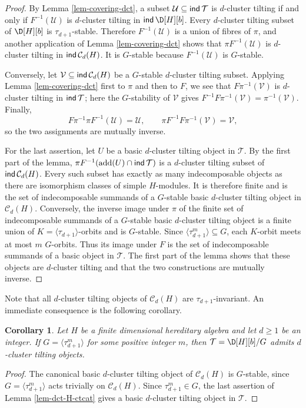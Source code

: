 \documentclass[12pt]{article}
\theoremstyle{plain}
\newtheorem{Coro}[Def]{Corollary}
\theoremstyle{definition}
\DeclareMathOperator{\add}{add}
\DeclareMathOperator{\ind}{\sf ind}
\newcommand{\Db}[1][]{\D[#1][b]}
\newcommand{\T}{\mathcal{T}}
\renewcommand{\geq}{\geqslant}
\begin{document}
\begin{proof}
By Lemma \ref{lem-covering-dct}, a subset
\(\mathcal U\subseteq\ind\mathcal T\) is $d$-cluster tilting if and only if
\(F^{-1}(\mathcal U)\) is $d$-cluster tilting in \(\ind\Db[H]\).  Every
$d$-cluster tilting subset of \(\Db[H]\) is
\(\tau_{d+1}\)-stable.  Therefore
\(F^{-1}(\mathcal U)\) is a union of fibres of \(\pi\), and another
application of Lemma \ref{lem-covering-dct} shows that
\(\pi F^{-1}(\mathcal U)\) is $d$-cluster tilting in
\(\ind\mathcal C_d(H)\).  It is $G$-stable because
\(F^{-1}(\mathcal U)\) is $G$-stable.

Conversely, let \(\mathcal V\subseteq\ind\mathcal C_d(H)\) be a $G$-stable
$d$-cluster tilting subset.  Applying Lemma \ref{lem-covering-dct} first to
\(\pi\) and then to \(F\), we see that
\(F\pi^{-1}(\mathcal V)\) is $d$-cluster tilting in
\(\ind\mathcal T\); here the $G$-stability of \(\mathcal V\) gives
\(F^{-1}F\pi^{-1}(\mathcal V)=\pi^{-1}(\mathcal V)\).  Finally,
\[
F\pi^{-1}\pi F^{-1}(\mathcal U)=\mathcal U,
\qquad
\pi F^{-1}F\pi^{-1}(\mathcal V)=\mathcal V,
\]
so the two assignments are mutually inverse.

For the last assertion, let \(U\) be a basic $d$-cluster tilting object in
\(\mathcal T\).  By the first part of the lemma,
\(\pi F^{-1}(\add(U)\cap\ind\mathcal T)\) is a $d$-cluster tilting subset of
\(\ind\mathcal C_d(H)\).  Every such subset has exactly as many
indecomposable objects as there are isomorphism classes of simple
$H$-modules.  It is therefore finite and is the set of
indecomposable summands of a $G$-stable basic $d$-cluster tilting object in
\(\mathcal C_d(H)\).  Conversely, the inverse image under \(\pi\) of the
finite set of indecomposable summands of a $G$-stable basic $d$-cluster
tilting object is a finite union of
\(K=\langle\tau_{d+1}\rangle\)-orbits and is $G$-stable.  Since
\(\langle\tau_{d+1}^m\rangle\subseteq G\), each $K$-orbit meets at most
$m$ $G$-orbits.  Thus its image under \(F\) is the set of indecomposable
summands of a basic object in
\(\mathcal T\).  The first part of the lemma shows that these objects are
$d$-cluster tilting and that the two constructions are mutually inverse.
\end{proof}

Note that all $d$-cluster tilting objects of $\mathcal{C}_d(H)$ are $\tau_{d+1}$-invariant. An immediate consequence is the following corollary. 
\begin{Coro}
\label{koro-taud-power}
Let $H$ be a finite dimensional hereditary algebra and let $d\geq 1$ be an integer. If $G=\langle\tau_{d+1}^m\rangle$ for some positive integer $m$, then $\T=\Db[H]/G$ admits $d$-cluster tilting objects. 
\end{Coro}
\begin{proof}
The canonical basic $d$-cluster tilting object of \(\mathcal C_d(H)\) is
$G$-stable, since $G=\langle\tau_{d+1}^m\rangle$ acts trivially on
\(\mathcal C_d(H)\).  Since \(\tau_{d+1}^m\in G\), the last assertion of
Lemma \ref{lem-dct-H-ctcat} gives a basic $d$-cluster tilting object in
\(\mathcal T\).
\end{proof}
 
\end{document}
